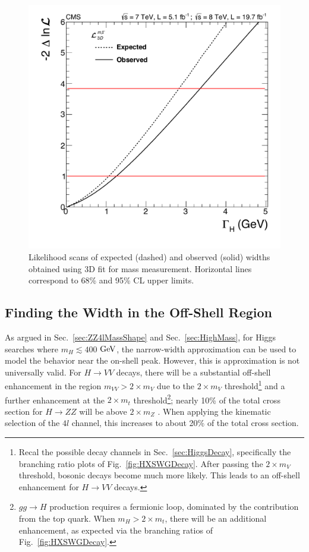 \begin{figure}[htbp]
\begin{center}
\includegraphics[width=.7\linewidth]{HiggsProperties/figures/width_3D.pdf}
\caption[Direct Measurement of Higgs Width in $4l$ Decay Channel]{Likelihood scans of expected (dashed) and observed (solid) widths obtained using 3D fit for mass measurement. Horizontal lines correspond to 68\% and 95\% CL upper limits.}
\label{fig:DirectHiggsWidth}
\end{center}
\end{figure}

\subsection{Finding the Width in the Off-Shell Region}
\label{sec:OffShellPheno}

As argued in Sec.~\ref{sec:ZZ4lMassShape} and Sec.~\ref{sec:HighMass}, for Higgs searches where $m_H \lesssim 400$ $\rm{GeV}$, the narrow-width approximation can be used to model the behavior near the on-shell peak. However, this is approximation is not universally valid. For $H\rightarrow VV$ decays, there will be a substantial off-shell enhancement in the region $m_{VV} > 2\times m_{V}$ due to the $2\times m_{V}$ threshold\footnote{Recal the possible decay channels in Sec.~\ref{sec:HiggsDecay}, specifically the branching ratio plots of Fig.~\ref{fig:HXSWGDecay}. After passing the $2\times m_{V}$ threshold, bosonic decays become much more likely. This leads to an off-shell enhancement for $H\rightarrow VV$ decays.} and a further enhancement at the $2\times m_{t}$ threshold\footnote{$gg\rightarrow H$ production requires a fermionic loop, dominated by the contribution from the top quark. When $m_H > 2\times m_{t}$, there will be an additional enhancement, as expected via the branching ratios of Fig.~\ref{fig:HXSWGDecay}.}; nearly 10\% of the total cross section for $H\rightarrow ZZ$ will be above $2\times m_{Z}$ \cite{}. When applying the kinematic selection of the $4l$ channel, this increases to about 20\% of the total cross section. 

